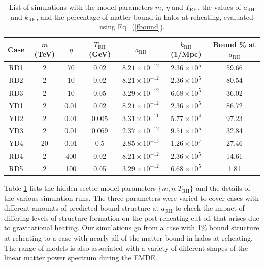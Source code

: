 \documentclass[a4paper,11pt]{article}
\newcommand{\rh}[1]{{#1}_{\mathrm{RH}}}
\begin{document}
\begin{table}[]
\begin{tabular}{|c|c|c|c|c|c|c|}
\hline
\textbf{Case} & \textbf{$m$ (TeV)} & \textbf{$\eta$} & \textbf{$\rh{T}$ (GeV)} & \textbf{$\rh{a}$} & \textbf{$\rh{k}$ (1/Mpc)} & Bound \% at $\rh{a}$ \\ \hline \hline
RD1           & 2                  & 70             & 0.02                    & $8.21\times 10^{-12}$          & $2.36 \times 10^5$        & 59.66               \\ 
RD2           & 2                  & 10             & 0.02                    & $8.21\times 10^{-12}$         & $2.36 \times 10^5$        & 80.54               \\ 
RD3           & 2                  & 10             & 0.05                    & $3.29\times 10^{-12}$          & $6.68 \times 10^5$        & 36.02               \\ 
YD1           & 2                  & 0.01           & 0.02                    & $8.21\times 10^{-12}$        & $2.36 \times 10^5$        & 86.72               \\ 
YD2           & 2                  & 0.01           & 0.005                   & $3.31\times 10^{-11}$          & $5.77 \times 10^4$        & 97.23               \\ 
YD3           & 2                  & 0.01           & 0.069                   & $2.37\times 10^{-12}$          & $9.51 \times 10^5$        & 32.84               \\ 
YD4           & 20                 & 0.01           & 0.5                     & $2.85\times 10^{-13}$          & $1.26 \times 10^7$        & 27.46               \\ 
RD4           & 2                  & 400            & 0.02                    & $8.21\times 10^{-12}$         & $2.36 \times 10^5$        & 14.61               \\ 
RD5           & 2                  & 100            & 0.05                    & $3.29\times 10^{-12}$     & $6.68 \times 10^5$        & 1.81                \\ \hline
\end{tabular}
\caption{List of simulations with the model parameters $m$, $\eta$ and $\rh{T}$, the values of $\rh{a}$ and $\rh{k}$, and the percentage of matter bound in halos at reheating, evaluated using Eq.~(\ref{fbound}).}
\label{tab:sim}
\end{table}

Table \ref{tab:sim} lists the hidden-sector model parameters $\{m,\eta,\rh{T}\}$ and the details of the various simulation runs. The three parameters were varied to cover cases with different amounts of predicted bound structure at $\rh{a}$ to check the impact of differing levels of structure formation on the post-reheating cut-off that arises due to gravitational heating. Our simulations go from a case with 1\% bound structure at reheating to a case with nearly all of the matter bound in halos at reheating.  The range of models is also associated with a variety of different shapes of the linear matter power spectrum during the EMDE.
\end{document}

